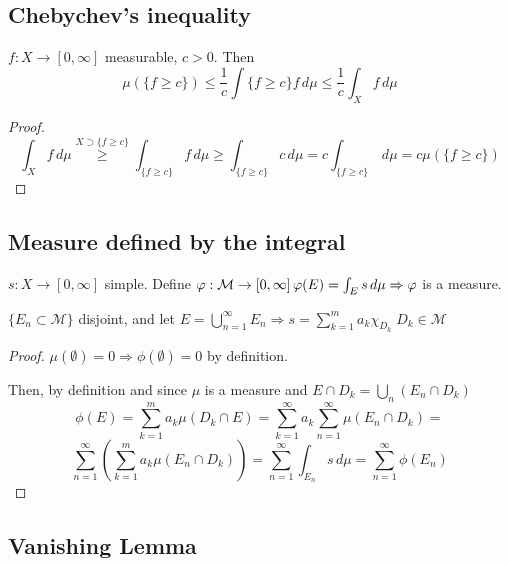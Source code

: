 \subsection{Chebychev's inequality}

\begin{theorem}
    \(f: X \to \left[0, \infty \right]\) measurable, \(c > 0\). Then \[ \mu\left(\{f \geq c \}\right) \leq \frac{1}{c} \int{\{f \geq c \}} f \, d\mu \leq \frac{1}{c} \int_X f \, d\mu \]
\end{theorem}
\begin{proof}
    \[ \int_X f \, d\mu \overset{X \supset \{f \geq c\}}{\geq} \int_{\{f \geq c \}} f \, d\mu \geq \int_{\{f \geq c\}} c \, d\mu 
    = c \int_{\{f \geq c\}} \, d\mu 
    = c \mu \left(\{f \geq c\}\right) \]
\end{proof}
\subsection{Measure defined by the integral}
\begin{theorem}
    \(s : X \to \left[0, \infty\right]\) simple. Define \(\phi : \mathcal{M} \to \left[0, \infty\right] \\ \phi(E) = \int_E s \, d\mu \\ \Rightarrow \phi \) is a measure. 
\end{theorem}
\begin{definition}
    \(\{E_n \subset \mathcal{M}\}\) disjoint, and let \(E = \bigcup_{n=1}^\infty E_n \Rightarrow s = \sum_{k=1}^m a_k \chi_{D_k} \; D_k \in \mathcal{M}
    \)
\end{definition}
\begin{proof}
    \(\mu(\emptyset) =0 \Rightarrow \phi(\emptyset)=0 \) by definition. 

    Then, by definition and since \(\mu\) is a measure and \(E \cap D_k = \bigcup_n (E_n \cap D_k)  \) 
    \[
        \phi(E) = \sum_{k=1}^m a_k \mu(D_k \cap E) = 
        \sum_{k=1}^\infty a_k \sum_{n=1}^\infty \mu(E_n \cap D_k)= 
    \]
    \[    
        \sum_{n=1}^\infty \left( \sum_{k=1}^m a_k \mu (E_n \cap D_k) \right) = 
        \sum_{n=1}^\infty \int_{E_n} s \, d\mu = 
        \sum_{n=1}^\infty \phi(E_n)
    \]
\end{proof}
\subsection{Vanishing Lemma}

